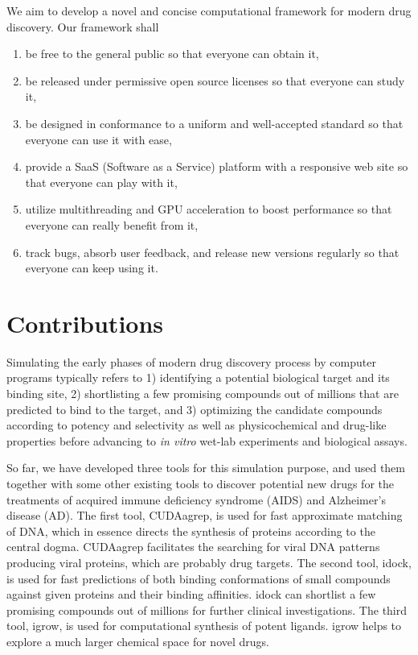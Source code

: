 We aim to develop a novel and concise computational framework for modern drug discovery. Our framework shall
\begin{enumerate}
\item be free to the general public so that everyone can obtain it,
\item be released under permissive open source licenses so that everyone can study it,
\item be designed in conformance to a uniform and well-accepted standard so that everyone can use it with ease,
\item provide a SaaS (Software as a Service) platform with a responsive web site so that everyone can play with it,
\item utilize multithreading and GPU acceleration to boost performance so that everyone can really benefit from it,
\item track bugs, absorb user feedback, and release new versions regularly so that everyone can keep using it.
\end{enumerate}

\section{Contributions}

Simulating the early phases of modern drug discovery process by computer programs typically refers to 1) identifying a potential biological target and its binding site, 2) shortlisting a few promising compounds out of millions that are predicted to bind to the target, and 3) optimizing the candidate compounds according to potency and selectivity as well as physicochemical and drug-like properties before advancing to \textit{in vitro} wet-lab experiments and biological assays.

So far, we have developed three tools for this simulation purpose, and used them together with some other existing tools to discover potential new drugs for the treatments of acquired immune deficiency syndrome (AIDS) and Alzheimer's disease (AD). The first tool, CUDAagrep, is used for fast approximate matching of DNA, which in essence directs the synthesis of proteins according to the central dogma. CUDAagrep facilitates the searching for viral DNA patterns producing viral proteins, which are probably drug targets. The second tool, idock, is used for fast predictions of both binding conformations of small compounds against given proteins and their binding affinities. idock can shortlist a few promising compounds out of millions for further clinical investigations. The third tool, igrow, is used for computational synthesis of potent ligands. igrow helps to explore a much larger chemical space for novel drugs.


